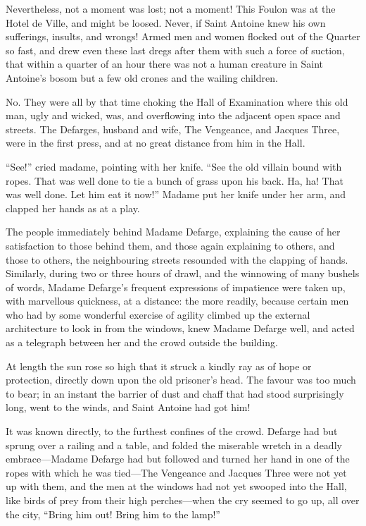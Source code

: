 Nevertheless, not a moment was lost; not a moment!  This Foulon was
at the Hotel de Ville, and might be loosed.  Never, if Saint Antoine
knew his own sufferings, insults, and wrongs!  Armed men and women
flocked out of the Quarter so fast, and drew even these last dregs
after them with such a force of suction, that within a quarter of an
hour there was not a human creature in Saint Antoine's bosom but a
few old crones and the wailing children.

No. They were all by that time choking the Hall of Examination where
this old man, ugly and wicked, was, and overflowing into the adjacent
open space and streets.  The Defarges, husband and wife, The Vengeance,
and Jacques Three, were in the first press, and at no great distance
from him in the Hall.

``See!'' cried madame, pointing with her knife.  ``See the old villain
bound with ropes.  That was well done to tie a bunch of grass upon
his back.  Ha, ha!  That was well done.  Let him eat it now!''  Madame
put her knife under her arm, and clapped her hands as at a play.

The people immediately behind Madame Defarge, explaining the cause of
her satisfaction to those behind them, and those again explaining
to others, and those to others, the neighbouring streets resounded with
the clapping of hands.  Similarly, during two or three hours of drawl,
and the winnowing of many bushels of words, Madame Defarge's frequent
expressions of impatience were taken up, with marvellous quickness,
at a distance:  the more readily, because certain men who had by some
wonderful exercise of agility climbed up the external architecture to
look in from the windows, knew Madame Defarge well, and acted as a
telegraph between her and the crowd outside the building.

At length the sun rose so high that it struck a kindly ray as of hope
or protection, directly down upon the old prisoner's head.  The favour
was too much to bear; in an instant the barrier of dust and chaff that
had stood surprisingly long, went to the winds, and Saint Antoine had
got him!

It was known directly, to the furthest confines of the crowd.  Defarge
had but sprung over a railing and a table, and folded the miserable
wretch in a deadly embrace---Madame Defarge had but followed and turned
her hand in one of the ropes with which he was tied---The Vengeance
and Jacques Three were not yet up with them, and the men at the windows
had not yet swooped into the Hall, like birds of prey from their high
perches---when the cry seemed to go up, all over the city, ``Bring him
out!  Bring him to the lamp!''

